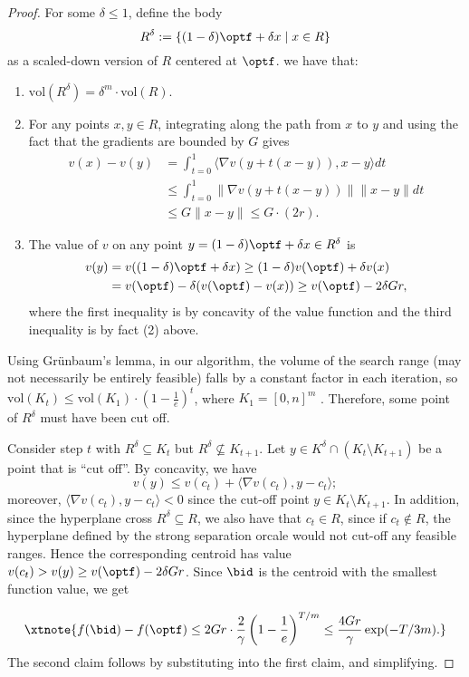 \begin{proof}
For some $\delta \leq 1$, define the body
\[
R^\delta := \{(1 - \delta)\optf + \delta x \mid x \in R\}
\]
as a scaled-down version of $R$ centered at $\optf$. we have that:
\begin{enumerate}
    \item $\text{vol}(R^\delta) = \delta^m \cdot \text{vol}(R)$.
    \item For any points $x, y \in R$, integrating along the path from $x$ to $y$ and using the fact that the gradients are bounded by $G$ gives
    \begin{align*}
        v(x) - v(y)& = \int_{t=0}^1 \langle \nabla v(y + t(x - y)), x - y \rangle  dt\\
         &\leq \int_{t=0}^1 \|\nabla v(y + t(x - y))\| \|x - y\| dt\\
         & \leq G \|x - y\| \leq G \cdot (2r).
    \end{align*}
    \item The value of $v$ on any point $y = (1 - \delta)\optf + \delta x \in R^\delta$ is
    \begin{align*}
        v(y) & = v((1 - \delta)\optf + \delta x) \geq (1 - \delta)v(\optf) + \delta v(x)\\
        & = v(\optf) - \delta (v(\optf) - v(x)) \geq v(\optf) - 2\delta Gr,
    \end{align*}
where the first inequality is by concavity of the value function and the third inequality is by fact (2) above.
\end{enumerate}
Using Grünbaum's lemma, in our algorithm, the volume of the search range (may not necessarily be entirely feasible) falls by a constant factor in each iteration, so $\text{vol}(K_t) \leq \text{vol}(K_1) \cdot \left(1 - \frac{1}{e}\right)^t$, where $K_1 = [0,n]^m$ . Therefore, some point of $R^\delta$ must have been cut off.

Consider step $t$ with $R^\delta \subseteq K_t$ but $R^\delta \not\subseteq K_{t+1}$. Let $y \in K^\delta \cap (K_t \setminus K_{t+1})$ be a point that is ``cut off''. By concavity, we have
\[
v(y) \leq v(c_t) + \langle \nabla v(c_t), y - c_t \rangle;
\]
moreover, $\langle \nabla v(c_t), y - c_t \rangle < 0$ since the cut-off point $y \in K_t \setminus K_{t+1}$. 
In addition, since the hyperplane cross $R^\delta \subseteq R$, we also have that $c_t \in R$, since if $c_t \notin R$, the hyperplane defined by the strong separation orcale would not cut-off any feasible ranges.
Hence the corresponding centroid has value $v(c_t) > v(y) \geq v(\optf) - 2\delta Gr$. Since $\bid$ is the centroid with the smallest function value, we get

\[
\xtnote{f(\bid) - f(\optf) \leq 2Gr \cdot \frac{2}{\gamma}\left(1 - \frac{1}{e}\right)^{T/m} \leq \frac{4Gr}{\gamma} \exp(-T/3m).}
\]
The second claim follows by substituting  into the first claim, and simplifying.
\end{proof}

